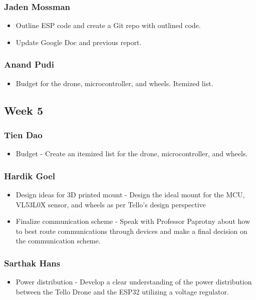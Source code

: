 \documentclass[12pt]{article}
\begin{document}
            \subsubsection*{Jaden Mossman}
                \begin{itemize}
                    \item Outline ESP code and create a Git repo with outlined code.
                    \item Update Google Doc and previous report.
                \end{itemize}
            \subsubsection*{Anand Pudi}
                \begin{itemize}
                    \item Budget for the drone, microcontroller, and wheels. Itemized list.
                \end{itemize}
        
        \subsection*{Week 5}
            \subsubsection*{Tien Dao}
                \begin{itemize}
                    \item Budget - Create an itemized list for the drone, microcontroller, and wheels.
                \end{itemize}
            \subsubsection*{Hardik Goel}
                \begin{itemize}
                    \item Design ideas for 3D printed mount - Design the ideal mount for the MCU, VL53L0X sensor, and wheels as per Tello's design perspective
                    \item Finalize communication scheme - Speak with Professor Paprotny about how to best route communications through devices and make a final decision on the communication scheme.
                \end{itemize}
            \subsubsection*{Sarthak Hans}
                \begin{itemize}
                    \item Power distribution - Develop a clear understanding of the power distribution between the Tello Drone and the ESP32 utilizing a voltage regulator.
                \end{itemize}
\end{document}
